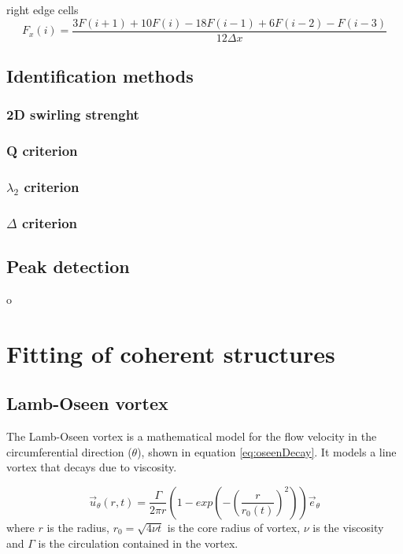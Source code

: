 \documentclass[12pt, a4paper, openany]{memoir}
\begin{document}
right edge cells
\begin{equation}
F_x(i) = \frac{3F(i+1)+10F(i)-18F(i-1)+6F(i-2) -F(i-3)}{12 \Delta x}
\end{equation}

\section{Identification methods}

\subsection{2D swirling strenght}

\subsection{Q criterion}

\subsection{$\lambda_2$ criterion}

\subsection{$\Delta$ criterion}

\section{Peak detection}
o

\chapter{Fitting of coherent structures}
\section{Lamb-Oseen vortex}

The Lamb-Oseen vortex is a mathematical model for the flow velocity in the circumferential direction ($\theta$), shown in equation \ref{eq:oseenDecay}. It models a line vortex that decays due to viscosity.

\begin{equation}
\label{eq:oseenDecay}
\vec{u}_\theta(r,t) = \frac{\Gamma}{2\pi r} \left( 1 - exp \left( -\left(\frac{r}{r_0(t)}\right)^2\right)\right) \vec{e}_{\theta}
\end{equation}
where $r$ is the radius, $r_0 = \sqrt{4 \nu t}$ is the core radius of vortex, $\nu$ is the viscosity and $\Gamma$ is the circulation contained in the vortex. 
\end{document}
